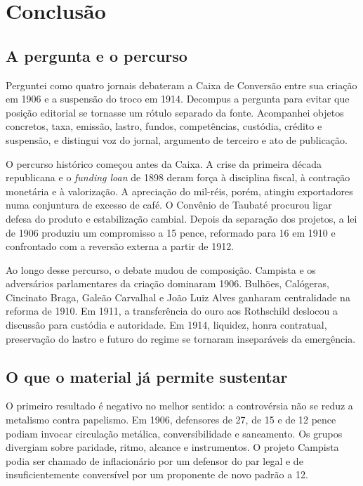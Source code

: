 \chapter*{Conclusão}

\section{A pergunta e o percurso}

Perguntei como quatro jornais debateram a Caixa de Conversão entre sua criação em 1906 e a suspensão do troco em 1914. Decompus a pergunta para evitar que posição editorial se tornasse um rótulo separado da fonte. Acompanhei objetos concretos, taxa, emissão, lastro, fundos, competências, custódia, crédito e suspensão, e distingui voz do jornal, argumento de terceiro e ato de publicação.

O percurso histórico começou antes da Caixa. A crise da primeira década republicana e o \textit{funding loan} de 1898 deram força à disciplina fiscal, à contração monetária e à valorização. A apreciação do mil-réis, porém, atingiu exportadores numa conjuntura de excesso de café. O Convênio de Taubaté procurou ligar defesa do produto e estabilização cambial. Depois da separação dos projetos, a lei de 1906 produziu um compromisso a 15 pence, reformado para 16 em 1910 e confrontado com a reversão externa a partir de 1912.

Ao longo desse percurso, o debate mudou de composição. Campista e os adversários parlamentares da criação dominaram 1906. Bulhões, Calógeras, Cincinato Braga, Galeão Carvalhal e João Luiz Alves ganharam centralidade na reforma de 1910. Em 1911, a transferência do ouro aos Rothschild deslocou a discussão para custódia e autoridade. Em 1914, liquidez, honra contratual, preservação do lastro e futuro do regime se tornaram inseparáveis da emergência.

\section{O que o material já permite sustentar}

O primeiro resultado é negativo no melhor sentido: a controvérsia não se reduz a metalismo contra papelismo. Em 1906, defensores de 27, de 15 e de 12 pence podiam invocar circulação metálica, conversibilidade e saneamento. Os grupos divergiam sobre paridade, ritmo, alcance e instrumentos. O projeto Campista podia ser chamado de inflacionário por um defensor do par legal e de insuficientemente conversível por um proponente de novo padrão a 12.

